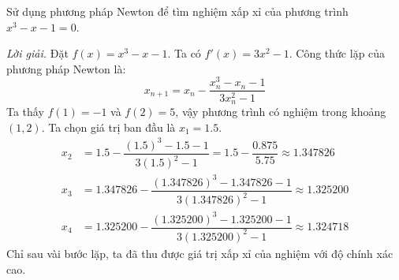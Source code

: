     
    
    
    


    

\begin{example}
Sử dụng phương pháp Newton để tìm nghiệm xấp xỉ của phương trình $x^3 - x - 1 = 0$.

\textit{Lời giải.}
Đặt $f(x) = x^3 - x - 1$. Ta có $f'(x) = 3x^2 - 1$.
Công thức lặp của phương pháp Newton là:
$$ x_{n+1} = x_n - \dfrac{x_n^3 - x_n - 1}{3x_n^2 - 1} $$
Ta thấy $f(1) = -1$ và $f(2) = 5$, vậy phương trình có nghiệm trong khoảng $(1, 2)$. Ta chọn giá trị ban đầu là $x_1 = 1.5$.
\begin{align*}
    x_2 &= 1.5 - \dfrac{(1.5)^3 - 1.5 - 1}{3(1.5)^2 - 1} = 1.5 - \dfrac{0.875}{5.75} \approx 1.347826 \\
    x_3 &= 1.347826 - \dfrac{(1.347826)^3 - 1.347826 - 1}{3(1.347826)^2 - 1} \approx 1.325200 \\
    x_4 &= 1.325200 - \dfrac{(1.325200)^3 - 1.325200 - 1}{3(1.325200)^2 - 1} \approx 1.324718
\end{align*}
Chỉ sau vài bước lặp, ta đã thu được giá trị xấp xỉ của nghiệm với độ chính xác cao.
\end{example}

